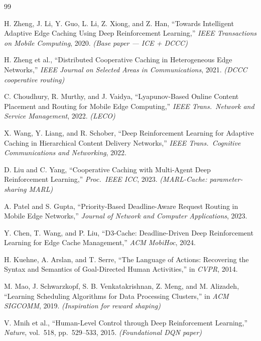 \documentclass[12pt,a4paper]{report}
\begin{document}
\renewcommand{\bibname}{References}
{}
\begin{thebibliography}{99}

H. Zheng, J. Li, Y. Guo, L. Li, Z. Xiong, and Z. Han,
``Towards Intelligent Adaptive Edge Caching Using Deep Reinforcement Learning,''
\textit{IEEE Transactions on Mobile Computing}, 2020. \emph{(Base paper --- ICE + DCCC)}

H. Zheng et al.,
``Distributed Cooperative Caching in Heterogeneous Edge Networks,''
\textit{IEEE Journal on Selected Areas in Communications}, 2021.
\emph{(DCCC cooperative routing)}

C. Choudhury, R. Murthy, and J. Vaidya,
``Lyapunov-Based Online Content Placement and Routing for Mobile Edge Computing,''
\textit{IEEE Trans.\ Network and Service Management}, 2022. \emph{(LECO)}

X. Wang, Y. Liang, and R. Schober,
``Deep Reinforcement Learning for Adaptive Caching in Hierarchical Content Delivery Networks,''
\textit{IEEE Trans.\ Cognitive Communications and Networking}, 2022.

D. Liu and C. Yang,
``Cooperative Caching with Multi-Agent Deep Reinforcement Learning,''
\textit{Proc.\ IEEE ICC}, 2023. \emph{(MARL-Cache: parameter-sharing MARL)}

A. Patel and S. Gupta,
``Priority-Based Deadline-Aware Request Routing in Mobile Edge Networks,''
\textit{Journal of Network and Computer Applications}, 2023.

Y. Chen, T. Wang, and P. Liu,
``D3-Cache: Deadline-Driven Deep Reinforcement Learning for Edge Cache Management,''
\textit{ACM MobiHoc}, 2024.

H. Kuehne, A. Arslan, and T. Serre,
``The Language of Actions: Recovering the Syntax and Semantics of Goal-Directed Human Activities,''
in \textit{CVPR}, 2014.

M. Mao, J. Schwarzkopf, S. B. Venkatakrishnan, Z. Meng, and M. Alizadeh,
``Learning Scheduling Algorithms for Data Processing Clusters,''
in \textit{ACM SIGCOMM}, 2019. \emph{(Inspiration for reward shaping)}

V. Mnih et al.,
``Human-Level Control through Deep Reinforcement Learning,''
\textit{Nature}, vol.\ 518, pp.\ 529--533, 2015. \emph{(Foundational DQN paper)}


\end{thebibliography}
\end{document}
